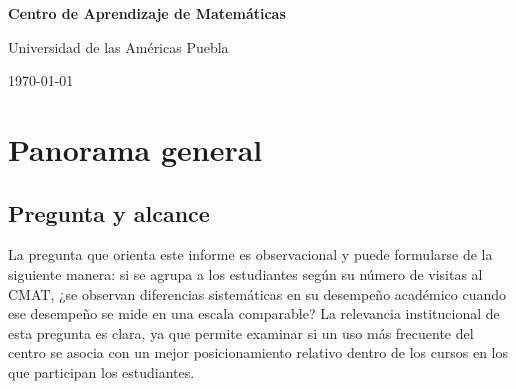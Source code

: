 \documentclass[8pt,a4paper]{article} %
\numberwithin{figure}{subsection}
\begin{document}
\begin{titlepage}
  \centering
  \vspace*{4cm}
  {\Huge\bfseries Centro de Aprendizaje de Matemáticas\par}
  \vspace{1cm}
  {\large Universidad de las Américas Puebla\par}
  \vfill
  {\large \today\par}
\end{titlepage}

\begin{abstract}
Este documento presenta una revisión estadística del uso del Centro de Aprendizaje de Matemáticas (CMAT) y de su asociación con el desempeño académico. La pregunta central es si, al comparar estudiantes con distintos niveles de asistencia al centro, aparecen diferencias sistemáticas en su rendimiento una vez que las calificaciones se vuelven comparables entre aulas. Para ello se trabaja con calificaciones estandarizadas por aula, es decir, con una medida que ubica a cada estudiante respecto del promedio y de la variación de su propio contexto docente.

El reporte conserva el recorrido analítico del estudio original. Primero describe la distribución de visitas al CMAT y justifica el corte entre estudiantes con estrictamente más de 3 visitas y aquellos con 3 visitas o menos. Después examina el tratamiento de registros sin calificación final, compara estrategias de imputación y documenta la variación en los patrones de calificación entre profesores y periodos. Finalmente, presenta comparaciones por aula y por estudiante mediante pruebas paramétricas y no paramétricas, tamaños de efecto e intervalos de confianza. En todo momento, la interpretación se mantiene en un plano observacional: los resultados describen asociaciones presentes en los datos, pero no establecen por sí solos una relación causal.
\end{abstract}

\newpage
\tableofcontents
\thispagestyle{empty}
\newpage

\section{Panorama general}

\subsection{Pregunta y alcance}
La pregunta que orienta este informe es observacional y puede formularse de la siguiente manera: si se agrupa a los estudiantes según su número de visitas al CMAT, ¿se observan diferencias sistemáticas en su desempeño académico cuando ese desempeño se mide en una escala comparable? La relevancia institucional de esta pregunta es clara, ya que permite examinar si un uso más frecuente del centro se asocia con un mejor posicionamiento relativo dentro de los cursos en los que participan los estudiantes.
\end{document}
